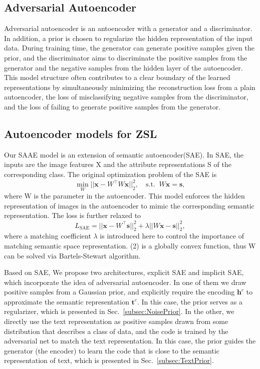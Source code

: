 \documentclass{article}
\newcommand{\bb}[1]{\boldsymbol{#1}}
\begin{document}
\subsection{Adversarial Autoencoder}
Adversarial autoencoder\cite{makhzani2015adversarial} is an antoencoder with a generator and a discriminator. In addition, a prior is chosen to regularize the hidden representation of the input data. During training time, the generator can generate positive samples given the prior, and the discriminator aims to discriminate the positive samples from the generator and the negative samples from the hidden layer of the autoencoder. This model structure often contributes to a clear boundary of the learned representations by simultaneously minimizing the reconstruction loss from a plain autoencoder, the loss of misclassifying negative samples from the discriminator, and the loss of failing to generate positive samples from the generator.


\subsection{Autoencoder models for ZSL}
Our SAAE model is an extension of semantic autoencoder(SAE)\cite{kodirov2017semantic}. In SAE, the inputs are the image features X and the attribute representations S of the corresponding class. The original optimization problem of the SAE is
    \begin{equation}
    \min_{W} || \bb{x} - W^{\top} W \bb{x} ||_2^2, \quad \text{s.t.} \;\; W \bb{x} = \bb{s},
    \end{equation}
   where W is the parameter in the autoencoder. This model enforces the hidden representation of images in the autoencoder to mimic the corresponding semantic representation. The loss is further relaxed to  
   \begin{equation}
   L_{\textrm{SAE}} = || \bb{x} - W^{\top} \bb{s}||_2^2 + \lambda || W \bb{x} - \bb{s} ||_2^2,
    \end{equation}
where a matching coefficient $\lambda$ is introduced here to control the importance of matching semantic space representation. (2) is a globally convex function, thus W can be solved via Bartels-Stewart algorithm\cite{lu1971solution}. 
    
    Based on SAE, We propose two architectures, explicit SAE and implicit SAE, which incorporate the idea of adversarial autoencoder. In one of them we draw positive samples from a Gaussian prior, and explicitly require the encoding $\bb{h}^c$ to approximate the semantic representation $ \bb{t}^c$. In this case, the prior serves as a regularizer, which is presented in Sec.~\ref{subsec:NoisePrior}. In the other, we directly use the text representation as positive samples drawn from some distribution that describes a class of data, and the code is trained by the adversarial net to match the text representation. In this case, the prior guides the generator (the encoder) to learn the code that is close to the semantic representation of text, which is presented in Sec.~\ref{subsec:TextPrior}.
\end{document}
